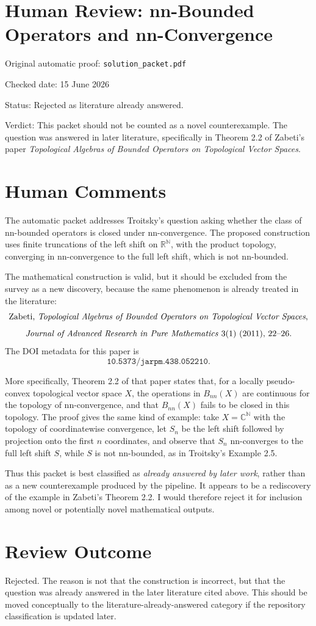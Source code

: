 \documentclass[11pt]{article}
\begin{document}
\section*{Human Review: nn-Bounded Operators and nn-Convergence}

\noindent Original automatic proof: \texttt{solution\_packet.pdf}

\noindent Checked date: 15 June 2026

\noindent Status: Rejected as literature already answered.

\noindent Verdict: This packet should not be counted as a novel counterexample. The question was answered in later literature, specifically in Theorem 2.2 of Zabeti's paper \emph{Topological Algebras of Bounded Operators on Topological Vector Spaces}.

\section*{Human Comments}

The automatic packet addresses Troitsky's question asking whether the class of nn-bounded operators is closed under nn-convergence. The proposed construction uses finite truncations of the left shift on \(\mathbb R^{\mathbb N}\), with the product topology, converging in nn-convergence to the full left shift, which is not nn-bounded.

The mathematical construction is valid, but it should be excluded from the survey as a new discovery, because the same phenomenon is already treated in the literature:
\[
\text{Zabeti, \emph{Topological Algebras of Bounded Operators on Topological Vector Spaces},}
\]
\[
\text{\emph{Journal of Advanced Research in Pure Mathematics} 3(1) (2011), 22--26.}
\]
The DOI metadata for this paper is
\[
\texttt{10.5373/jarpm.438.052210}.
\]

More specifically, Theorem 2.2 of that paper states that, for a locally pseudo-convex topological vector space \(X\), the operations in \(B_{nn}(X)\) are continuous for the topology of nn-convergence, and that \(B_{nn}(X)\) fails to be closed in this topology. The proof gives the same kind of example: take \(X=\mathbb C^{\mathbb N}\) with the topology of coordinatewise convergence, let \(S_n\) be the left shift followed by projection onto the first \(n\) coordinates, and observe that \(S_n\) nn-converges to the full left shift \(S\), while \(S\) is not nn-bounded, as in Troitsky's Example 2.5.

Thus this packet is best classified as \emph{already answered by later work}, rather than as a new counterexample produced by the pipeline. It appears to be a rediscovery of the example in Zabeti's Theorem 2.2. I would therefore reject it for inclusion among novel or potentially novel mathematical outputs.

\section*{Review Outcome}

Rejected. The reason is not that the construction is incorrect, but that the question was already answered in the later literature cited above. This should be moved conceptually to the literature-already-answered category if the repository classification is updated later.
\end{document}
